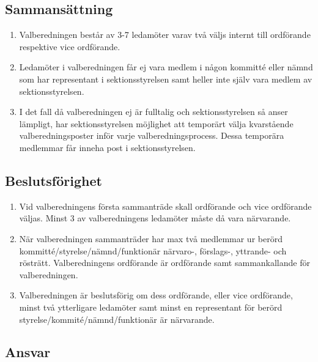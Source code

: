 \documentclass[11pt,a4paper]{article}
\begin{document}
\subsection{Sammansättning}

\begin{enumerate}[\thesubsection .1]


  
  \item Valberedningen består av 3-7 ledamöter varav två väljs internt till ordförande respektive vice ordförande.
  
  \item Ledamöter i valberedningen får ej vara medlem i någon kommitté eller nämnd som har representant i sektionsstyrelsen samt heller inte själv vara medlem av sektionsstyrelsen.

\item I det fall då valberedningen ej är fulltalig och sektionsstyrelsen så anser lämpligt, har sektionsstyrelsen möjlighet att temporärt välja kvarstående valberedningsposter inför varje valberedningsprocess. Dessa temporära medlemmar får inneha post i sektionsstyrelsen.
\end{enumerate}

\subsection{Beslutsförighet}

\begin{enumerate}[\thesubsection .1]

\item Vid valberedningens första sammanträde skall ordförande och vice ordförande väljas. Minst 3 av valberedningens ledamöter måste då vara närvarande.

  \item När valberedningen sammanträder har max två medlemmar ur berörd kommitté/\-styrelse/nämnd/funktionär närvaro-, för\-slags-, yttrande- och rösträtt. Valberedningens  ord\-för\-ande är ordförande samt sammankallande för valberedningen.

  \item Valberedningen är beslutsförig om dess ordförande, eller vice ordförande, minst två ytterligare ledamöter samt minst en representant för berörd styrelse/\-kommité/\-nämnd/\-funktionär är närvarande.

\end{enumerate}

\subsection{Ansvar}
\end{document}
